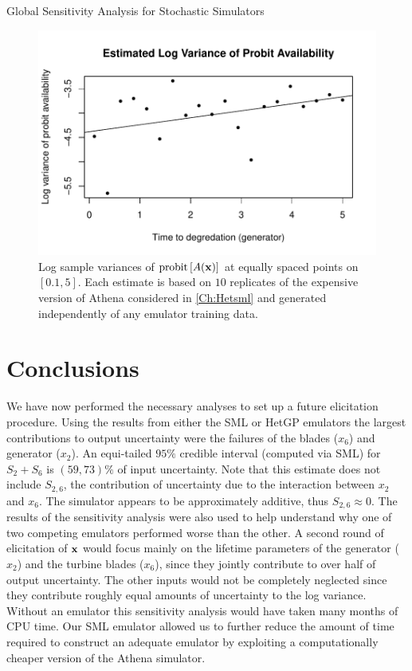 \begin{chapter}{Global Sensitivity Analysis for Stochastic Simulators\label{Ch:sensitivity}}
\begin{figure}
  \centering
  \includegraphics[width = 6in]{sml-het-fig2/log-var-reps2.pdf}
  \caption{Log sample variances of $\text{probit}\,[A(\mathbf{x})]$ at equally spaced points on $[0.1, 5]$. Each estimate is based on $10$ replicates of the expensive version of Athena considered in \cref{Ch:Hetsml} and generated independently of any emulator training data. \label{Fig:log-vars}}
\end{figure}
\section{Conclusions}
We have now performed the necessary analyses to set up a future elicitation procedure. Using the results from either the SML or HetGP emulators the largest contributions to output uncertainty were the failures of the blades ($x_6$) and generator ($x_2$). An equi-tailed $95\%$ credible interval (computed via SML) for $S_2 + S_6$ is $(59,73)\%$ of input uncertainty. Note that this estimate does not include $S_{2,6}$, the contribution of uncertainty due to the interaction between $x_2$ and $x_6$. The simulator appears to be approximately additive, thus $S_{2,6} \approx 0$. The results of the sensitivity analysis were also used to help understand why one of two competing emulators performed worse than the other. A second round of elicitation of $\mathbf{x}$ would focus mainly on the lifetime parameters of the generator ($x_2$) and the turbine blades ($x_6$), since they jointly contribute to over half of output uncertainty. The other inputs would not be completely neglected since they contribute roughly equal amounts of uncertainty to the log variance. Without an emulator this sensitivity analysis would have taken many months of CPU time. Our SML emulator allowed us to further reduce the amount of time required to construct an adequate emulator by exploiting a computationally cheaper version of the Athena simulator.


\end{chapter}
